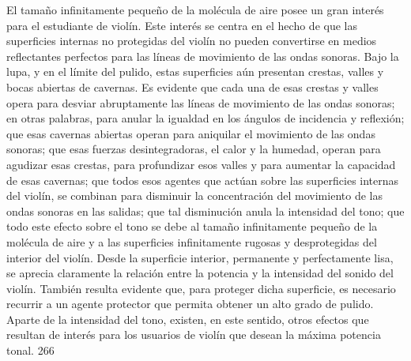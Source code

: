 El tamaño infinitamente pequeño de la molécula de aire posee un gran interés para el estudiante de violín. Este interés se centra en el hecho de que las superficies internas no protegidas del violín no pueden convertirse en medios reflectantes perfectos para las líneas de movimiento de las ondas sonoras. Bajo la lupa, y en el límite del pulido, estas superficies aún presentan crestas, valles y bocas abiertas de cavernas. Es evidente que cada una de esas crestas y valles opera para desviar abruptamente las líneas de movimiento de las ondas sonoras; en otras palabras, para anular la igualdad en los ángulos de incidencia y reflexión; que esas cavernas abiertas operan para aniquilar el movimiento de las ondas sonoras; que esas fuerzas desintegradoras, el calor y la humedad, operan para agudizar esas crestas, para profundizar esos valles y para aumentar la capacidad de esas cavernas; que todos esos agentes que actúan sobre las superficies internas del violín, se combinan para disminuir la concentración del movimiento de las ondas sonoras en las salidas; que tal disminución anula la intensidad del tono; que todo este efecto sobre el tono se debe al tamaño infinitamente pequeño de la molécula de aire y a las superficies infinitamente rugosas y desprotegidas del interior del violín.
Desde la superficie interior, permanente y perfectamente lisa, se aprecia claramente la relación entre la potencia y la intensidad del sonido del violín.
También resulta evidente que, para proteger dicha superficie, es necesario recurrir a un agente protector que permita obtener un alto grado de pulido.
Aparte de la intensidad del tono, existen, en este sentido, otros efectos que resultan de interés para los usuarios de violín que desean la máxima potencia tonal.
266

